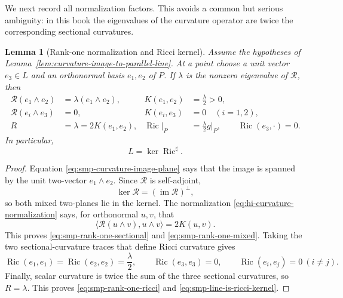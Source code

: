 \documentclass[10pt]{coll-l}
\newtheorem{lemma}[theorem]{Lemma}
\theoremstyle{definition}
\theoremstyle{remark}
\numberwithin{section}{chapter}
\numberwithin{equation}{chapter}
\newcommand{\Ric}{\operatorname{Ric}}
\begin{document}
We next record all normalization factors.  This avoids a common but serious
ambiguity: in this book the eigenvalues of the curvature operator are twice
the corresponding sectional curvatures.

\begin{lemma}[Rank-one normalization and Ricci kernel]
\label{lem:rank-one-normalization}
Assume the hypotheses of
Lemma~\ref{lem:curvature-image-to-parallel-line}.  At a point choose a unit
vector $e_3\in L$ and an orthonormal basis $e_1,e_2$ of $P$.  If $\lambda$
is the nonzero eigenvalue of $\mathcal R$, then
\begin{align}
 \mathcal R(e_1\wedge e_2)&=\lambda(e_1\wedge e_2),
      & K(e_1,e_2)&=\frac{\lambda}{2}>0,                 \label{eq:smp-rank-one-sectional}\\
 \mathcal R(e_i\wedge e_3)&=0,
      & K(e_i,e_3)&=0\quad(i=1,2),                       \label{eq:smp-rank-one-mixed}\\
 R&=\lambda=2K(e_1,e_2),
      & \Ric|_P&=\frac{\lambda}{2}g|_P,
      \qquad \Ric(e_3,\cdot)=0.                         \label{eq:smp-rank-one-ricci}
\end{align}
In particular,
\begin{equation}
                         L=\ker\Ric^\sharp.              \label{eq:smp-line-is-ricci-kernel}
\end{equation}
\end{lemma}

\begin{proof}
Equation \eqref{eq:smp-curvature-image-plane} says that the image is
spanned by the unit two-vector $e_1\wedge e_2$.  Since $\mathcal R$ is
self-adjoint,
\[
       \ker\mathcal R=(\operatorname{im}\mathcal R)^\perp,
\]
so both mixed two-planes lie in the kernel.  The normalization
\eqref{eq:hi-curvature-normalization} says, for orthonormal $u,v$, that
\[
        \langle\mathcal R(u\wedge v),u\wedge v\rangle
                       =2K(u,v).
\]
This proves \eqref{eq:smp-rank-one-sectional} and
\eqref{eq:smp-rank-one-mixed}.  Taking the two sectional-curvature traces
that define Ricci curvature gives
\[
 \Ric(e_1,e_1)=\Ric(e_2,e_2)=\frac{\lambda}{2},
 \qquad \Ric(e_3,e_3)=0,
 \qquad \Ric(e_i,e_j)=0\ (i\neq j).
\]
Finally, scalar curvature is twice the sum of the three sectional curvatures,
so $R=\lambda$.  This proves \eqref{eq:smp-rank-one-ricci} and
\eqref{eq:smp-line-is-ricci-kernel}.
\end{proof}
\end{document}

